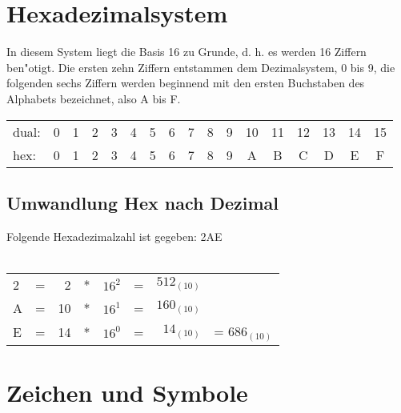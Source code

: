 \section{Hexadezimalsystem}
In diesem System liegt die Basis 16 zu Grunde, d. h. es werden 16 Ziffern ben"otigt.
Die ersten zehn Ziffern entstammen dem Dezimalsystem, 0 bis 9, die folgenden sechs
Ziffern werden beginnend mit den ersten Buchstaben des Alphabets bezeichnet, also A bis F. \\

\begin{minipage}{0.5\textwidth}
\begin{tabular}{lcccccccccccccccc}
dual: & 0 & 1 & 2 & 3 & 4 & 5 & 6 & 7 & 8 & 9 & 10 & 11 & 12 & 13 & 14 & 15 \\
hex:  & 0 & 1 & 2 & 3 & 4 & 5 & 6 & 7 & 8 & 9 & A  & B  & C  & D  & E  & F
\end{tabular}
\end{minipage}

\subsection{Umwandlung Hex nach Dezimal}
Folgende Hexadezimalzahl ist gegeben: 2AE\\
\\
\begin{minipage}{0.5\textwidth}
\begin{tabular}{lcrccrrl}
2 & = &  2 & * & $16^2$ & = & $512_{(10)}$ \\
A & = & 10 & * & $16^1$ & = & $160_{(10)}$ \\
E & = & 14 & * & $16^0$ & = & $ 14_{(10)}$ &  = $686_{(10)}$ \\
\end{tabular}
\end{minipage}

\section{Zeichen und Symbole}

\begin{minipage}{0.5\textwidth}
    \centering
    \legendezbereiche \bildzrange
    \label{fig:zahlenbereiche}
\end{minipage}

